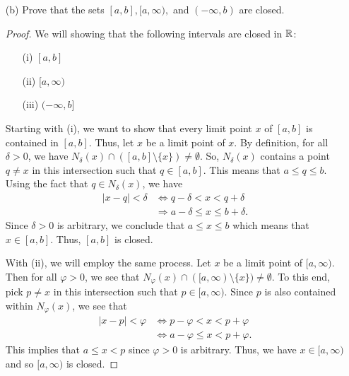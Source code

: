 \documentclass[a4paper]{article}
\begin{document}
\begin{enumerate}
\begin{enumerate}
\begin{proof}
                Lastly, fix \( x \in (- \infty , b ) \). Consider the open interval \( (x,b)  \) and let \( y \in (x,b) \). Choose \( \delta = \frac{ 1 }{ 2 }  \min \{ | b- y |, | y - x  |  \} > 0  \). Then we have 
                \[  {N}_{\delta}(y) \subseteq (x,b) \subseteq (b,\infty ) \]
                which shows that \( {N}_{\delta}(y) \) is an open set.
                \end{proof}
            \item[(b)] Prove that the sets \( [a,b], [a,\infty), \) and \( (-\infty, b ) \) are closed.
                \begin{proof}
                We will showing that the following intervals are closed in \( \mathbb{R}  \):
                \begin{enumerate}
                    \item[(i)] \( [a,b] \)
                    \item[(ii)] \( [a,\infty ) \)
                    \item[(iii)] \( (-\infty,b] \)
                \end{enumerate}
                Starting with (i), we want to show that every limit point \( x \) of \( [a,b] \) is contained in \( [a,b] \). Thus, let \( x  \) be a limit point of \( x  \). By definition, for all \( \delta > 0  \), we have \( {N}_{\delta}(x) \cap ( [a,b] \setminus  \{ x \} ) \neq \emptyset \). So, \( {N}_{\delta}(x) \) contains a point \( q \neq x  \) in this intersection such that \( q \in [a,b]  \). This means that \( a \leq q \leq b  \). Using the fact that \( q \in {N}_{\delta}(x) \), we have  
                \begin{align*}
                    |  x-  q  |  < \delta &\Longleftrightarrow q - \delta < x < q + \delta  \\
                                          &\Longrightarrow a - \delta \leq x \leq b + \delta.
                \end{align*}
                Since \( \delta > 0  \) is arbitrary, we conclude that \( a \leq x \leq b  \) which means that \( x \in [a,b] \). Thus, \( [a,b] \) is closed.

                With (ii), we will employ the same process. Let \( x  \) be a limit point of \( [a,\infty)  \). Then for all \( \varphi > 0  \), we see that \( {N}_{\varphi}(x) \cap ([a,\infty) \setminus  \{ x \} ) \neq \emptyset  \). To this end, pick \( p \neq x  \) in this intersection such that \( p \in [a,\infty) \). Since \( p  \) is also contained within \( {N}_{\varphi}(x) \), we see that  
                \begin{align*}  | x - p  |  < \varphi &\Longleftrightarrow p - \varphi < x < p + \varphi \\
                    &\Longleftrightarrow a - \varphi \leq x < p + \varphi.
                \end{align*}
                This implies that \( a \leq x < p  \) since \( \varphi > 0 \) is arbitrary. Thus, we have \( x \in [a,\infty ) \) and so \( [a,\infty ) \) is closed.  


\end{proof}
\end{enumerate}
\end{enumerate}
\end{document}
